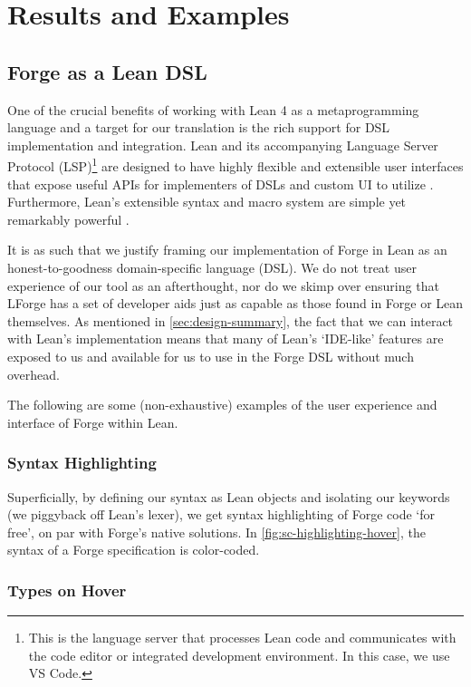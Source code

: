 \section{Results and Examples}

\subsection{Forge as a Lean DSL}\label{sec:dsl}
One of the crucial benefits of working with Lean 4 as a metaprogramming language and a target for our translation is the rich support for DSL implementation and integration. Lean and its accompanying Language Server Protocol (LSP)\footnote{This is the language server that processes Lean code and communicates with the code editor or integrated development environment. In this case, we use VS Code.} are designed to have highly flexible and extensible user interfaces that expose useful APIs for implementers of DSLs and custom UI to utilize \cite{moura2021lean, nawrocki2023extensible}. Furthermore, Lean's extensible syntax and macro system are simple yet remarkably powerful \cite{ullrich2022beyond, metaprogramming}. 

It is as such that we justify framing our implementation of Forge in Lean as an honest-to-goodness domain-specific language (DSL). We do not treat user experience of our tool as an afterthought, nor do we skimp over ensuring that LForge has a set of developer aids just as capable as those found in Forge or Lean themselves. As mentioned in \cref{sec:design-summary}, the fact that we can interact with Lean's implementation means that many of Lean's `IDE-like' features are exposed to us and available for us to use in the Forge DSL without much overhead. 

The following are some (non-exhaustive) examples of the user experience and interface of Forge within Lean. 

\subsubsection{Syntax Highlighting}

Superficially, by defining our syntax as Lean objects and isolating our keywords (we piggyback off Lean's lexer), we get syntax highlighting of Forge code `for free', on par with Forge's native solutions. In \cref{fig:sc-highlighting-hover}, the syntax of a Forge specification is color-coded. 

\subsubsection{Types on Hover}

